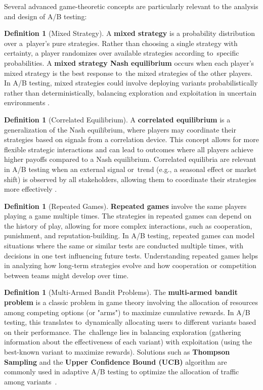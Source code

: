 \documentclass[magisterska, english]{pwr_wmat_praca_dyplomowa}
\theoremstyle{plain}
\numberwithin{theorem}{chapter}
\theoremstyle{definition}
\numberwithin{theorem}{chapter}
\newtheorem{definition}[theorem]{Definition}
\begin{document}
Several advanced game-theoretic concepts are particularly relevant to the analysis and design of A/B testing:

\begin{definition}[Mixed Strategy]
	A \textbf{mixed strategy} is a probability distribution over a~player's pure strategies. Rather than choosing a single strategy with certainty, a player randomizes over available strategies according to~specific probabilities. A \textbf{mixed strategy Nash equilibrium} occurs when each player's mixed strategy is the best response to~the mixed strategies of the other players. In A/B testing, mixed strategies could involve deploying variants probabilistically rather than deterministically, balancing exploration and exploitation in uncertain environments \cite{Aumann1974}.
\end{definition}

\begin{definition}[Correlated Equilibrium]
	A \textbf{correlated equilibrium} is a generalization of the Nash equilibrium, where players may coordinate their strategies based on signals from a correlation device. This concept allows for more flexible strategic interactions and can lead to outcomes where all players achieve higher payoffs compared to a Nash equilibrium. Correlated equilibria are relevant in A/B testing when an external signal or~trend (e.g., a seasonal effect or market shift) is observed by all stakeholders, allowing them to coordinate their strategies more effectively \cite{Aumann1987}.
\end{definition}

\begin{definition}[Repeated Games]
	\textbf{Repeated games} involve the same players playing a game multiple times. The strategies in repeated games can depend on the history of play, allowing for more complex interactions, such as cooperation, punishment, and reputation-building. In A/B testing, repeated games can model situations where the same or similar tests are conducted multiple times, with decisions in one test influencing future tests. Understanding repeated games helps in analyzing how long-term strategies evolve and how cooperation or competition between teams might develop over time.
\end{definition}

\begin{definition}[Multi-Armed Bandit Problems]
	The \textbf{multi-armed bandit problem} is a classic problem in game theory involving the allocation of resources among competing options (or "arms") to maximize cumulative rewards. In A/B testing, this translates to~dynamically allocating users to different variants based on their performance. The~challenge lies in balancing exploration (gathering information about the effectiveness of each variant) with exploitation (using the best-known variant to maximize rewards). Solutions such as \textbf{Thompson Sampling} and the \textbf{Upper Confidence Bound (UCB)} algorithm are commonly used in adaptive A/B testing to optimize the allocation of traffic among variants~\cite{Lai1985}.
\end{definition}
\end{document}
